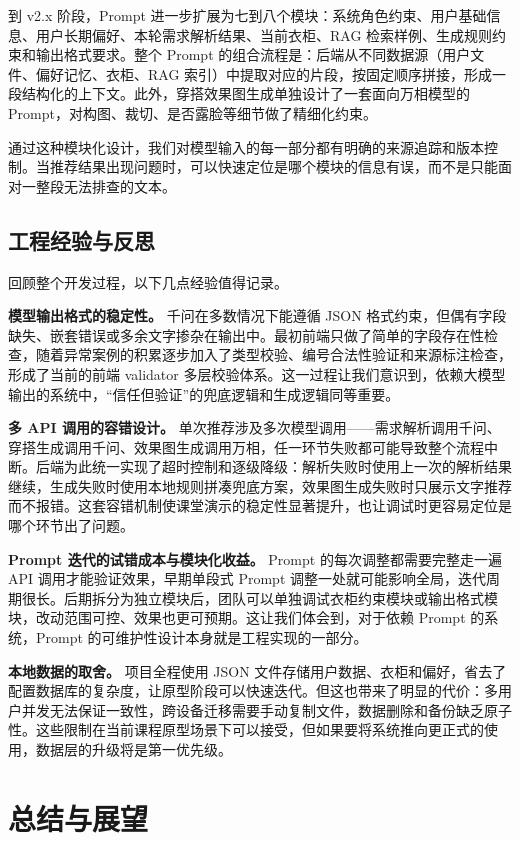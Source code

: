 \documentclass{applemlr}
\begin{document}
到 v2.x 阶段，Prompt 进一步扩展为七到八个模块：系统角色约束、用户基础信息、用户长期偏好、本轮需求解析结果、当前衣柜、RAG 检索样例、生成规则约束和输出格式要求。整个 Prompt 的组合流程是：后端从不同数据源（用户文件、偏好记忆、衣柜、RAG 索引）中提取对应的片段，按固定顺序拼接，形成一段结构化的上下文。此外，穿搭效果图生成单独设计了一套面向万相模型的 Prompt，对构图、裁切、是否露脸等细节做了精细化约束。

通过这种模块化设计，我们对模型输入的每一部分都有明确的来源追踪和版本控制。当推荐结果出现问题时，可以快速定位是哪个模块的信息有误，而不是只能面对一整段无法排查的文本。

\subsection{工程经验与反思}

回顾整个开发过程，以下几点经验值得记录。

\textbf{模型输出格式的稳定性。} 千问在多数情况下能遵循 JSON 格式约束，但偶有字段缺失、嵌套错误或多余文字掺杂在输出中。最初前端只做了简单的字段存在性检查，随着异常案例的积累逐步加入了类型校验、编号合法性验证和来源标注检查，形成了当前的前端 validator 多层校验体系。这一过程让我们意识到，依赖大模型输出的系统中，``信任但验证''的兜底逻辑和生成逻辑同等重要。

\textbf{多 API 调用的容错设计。} 单次推荐涉及多次模型调用——需求解析调用千问、穿搭生成调用千问、效果图生成调用万相，任一环节失败都可能导致整个流程中断。后端为此统一实现了超时控制和逐级降级：解析失败时使用上一次的解析结果继续，生成失败时使用本地规则拼凑兜底方案，效果图生成失败时只展示文字推荐而不报错。这套容错机制使课堂演示的稳定性显著提升，也让调试时更容易定位是哪个环节出了问题。

\textbf{Prompt 迭代的试错成本与模块化收益。} Prompt 的每次调整都需要完整走一遍 API 调用才能验证效果，早期单段式 Prompt 调整一处就可能影响全局，迭代周期很长。后期拆分为独立模块后，团队可以单独调试衣柜约束模块或输出格式模块，改动范围可控、效果也更可预期。这让我们体会到，对于依赖 Prompt 的系统，Prompt 的可维护性设计本身就是工程实现的一部分。

\textbf{本地数据的取舍。} 项目全程使用 JSON 文件存储用户数据、衣柜和偏好，省去了配置数据库的复杂度，让原型阶段可以快速迭代。但这也带来了明显的代价：多用户并发无法保证一致性，跨设备迁移需要手动复制文件，数据删除和备份缺乏原子性。这些限制在当前课程原型场景下可以接受，但如果要将系统推向更正式的使用，数据层的升级将是第一优先级。

\section{总结与展望}
\label{sec:conclusion}
\end{document}
